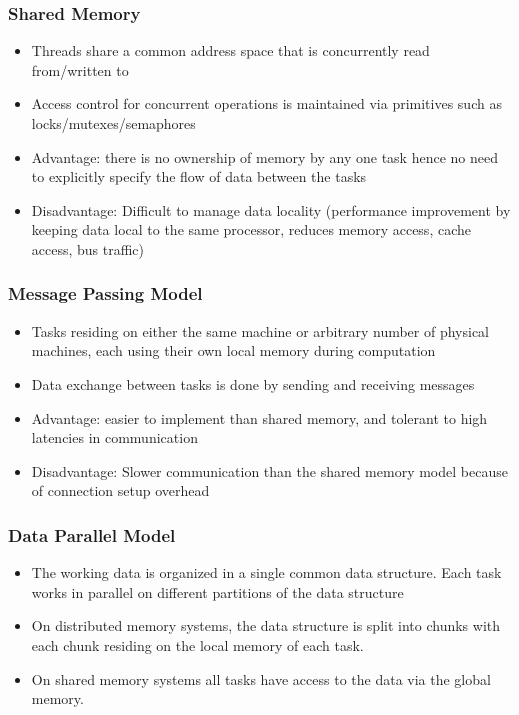 \documentclass{article}
\begin{document}
\subsubsection{Shared Memory}
\begin{itemize}
    \item Threads share a common address space that is concurrently read from/written to
    
    \item Access control for concurrent operations is maintained via primitives such as locks/mutexes/semaphores
    
    \item Advantage: there is no ownership of memory by any one task hence no need to explicitly specify the flow of data between the tasks
    
    \item Disadvantage: Difficult to manage data locality (performance improvement by keeping data local to the same processor, reduces memory access, cache access, bus traffic)
\end{itemize}

\subsubsection{Message Passing Model}
\begin{itemize}
    \item Tasks residing on either the same machine or arbitrary number of physical machines, each using their own local memory during computation
    
    \item Data exchange between tasks is done by sending and receiving messages
    
    \item Advantage: easier to implement than shared memory, and tolerant to high latencies in communication
    
    \item Disadvantage: Slower communication than the shared memory model because of connection setup overhead
\end{itemize}

\subsubsection{Data Parallel Model}
\begin{itemize}
    \item The working data is organized in a single common data structure. Each task works in parallel on different partitions of the data structure
    
    \item On distributed memory systems, the data structure is split into chunks with each chunk residing on the local memory of each task.
    
    \item On shared memory systems all tasks have access to the data via the global memory.
\end{itemize}
\end{document}
